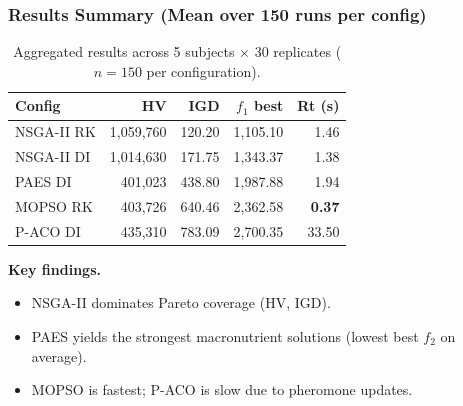 \documentclass[aspectratio=169,10pt]{beamer}
\begin{document}
\begin{frame}
\frametitle{Results Summary (Mean over 150 runs per config)}

\begin{table}
\centering\small
\begin{tabular}{lrrrr}
\toprule
\textbf{Config} & \textbf{HV} & \textbf{IGD} & \textbf{$f_1$ best} & \textbf{Rt (s)} \\
\midrule
NSGA-II RK & 1{,}059{,}760 & 120.20 & 1{,}105.10 & 1.46 \\
NSGA-II DI & 1{,}014{,}630 & 171.75 & 1{,}343.37 & 1.38 \\
PAES DI    & 401{,}023     & 438.80 & 1{,}987.88 & 1.94 \\
MOPSO RK   & 403{,}726     & 640.46 & 2{,}362.58 & \textbf{0.37} \\
P-ACO DI   & 435{,}310     & 783.09 & 2{,}700.35 & 33.50 \\
\bottomrule
\end{tabular}
\caption{Aggregated results across 5 subjects $\times$ 30 replicates ($n=150$ per configuration).}
\end{table}

\vspace{0.2cm}

\textbf{Key findings.}
\begin{itemize}
  \item NSGA-II dominates Pareto coverage (HV, IGD).
  \item PAES yields the strongest macronutrient solutions (lowest best $f_2$ on average).
  \item MOPSO is fastest; P-ACO is slow due to pheromone updates.
\end{itemize}

\end{frame}
\end{document}
